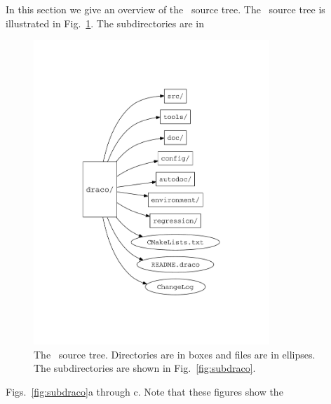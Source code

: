 In this section we give an overview of the \draco\ source tree. The
\draco\ source tree is illustrated in Fig.~\ref{fig:src_draco}.  The
subdirectories are in 
\begin{figure}
  \centerline{\includegraphics[clip,trim=1cm 4cm 1cm 4cm,width=3.5in]{fig/src_draco}} %
  \caption{The \draco\ source tree.  Directories are in boxes and
    files are in ellipses.  The subdirectories are shown in
    Fig.~\ref{fig:subdraco}.}
  \label{fig:src_draco}
\end{figure}
Figs.~\ref{fig:subdraco}a through c.  Note that these figures show the
